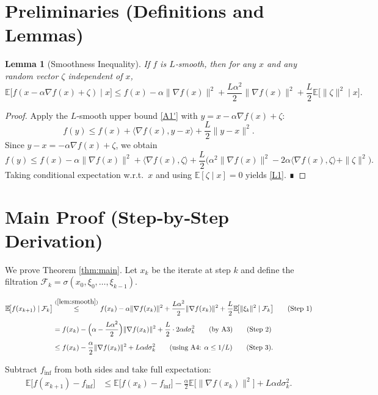 \documentclass{article}
\newtheorem{lemma}{Lemma}
\begin{document}
\newpage
\section*{Preliminaries (Definitions and Lemmas)}
\begin{lemma}[Smoothness Inequality]\label{lem:smooth}
If $f$ is $L$‑smooth, then for any $x$ and any random vector $\zeta$ independent of $x$,
\[
\mathbb{E}\!\bigl[f(x-\alpha\nabla f(x)+\zeta)\mid x\bigr]
\le f(x)-\alpha\|\nabla f(x)\|^{2}
+\frac{L\alpha^{2}}{2}\|\nabla f(x)\|^{2}
+\frac{L}{2}\mathbb{E}\!\bigl[\|\zeta\|^{2}\mid x\bigr].
\tag{L1}
\]
\end{lemma}
\begin{proof}
Apply the $L$‑smooth upper bound \eqref{A1'} with $y=x-\alpha\nabla f(x)+\zeta$:
\[
f(y)\le f(x)+\langle\nabla f(x),y-x\rangle+\frac{L}{2}\|y-x\|^{2}.
\]
Since $y-x=-\alpha\nabla f(x)+\zeta$, we obtain
\[
f(y)\le f(x)-\alpha\|\nabla f(x)\|^{2}
+\langle\nabla f(x),\zeta\rangle
+\frac{L}{2}\bigl(\alpha^{2}\|\nabla f(x)\|^{2}
-2\alpha\langle\nabla f(x),\zeta\rangle+\|\zeta\|^{2}\bigr).
\]
Taking conditional expectation w.r.t.\ $x$ and using $\mathbb{E}[\zeta\mid x]=0$ yields \eqref{L1}. ∎
\end{proof}

\section*{Main Proof (Step‑by‑Step Derivation)}
We prove Theorem \ref{thm:main}. Let $x_{k}$ be the iterate at step $k$ and define the filtration $\mathcal{F}_{k}=\sigma(x_{0},\xi_{0},\dots,\xi_{k-1})$.

\begin{align}
\mathbb{E}\!\bigl[f(x_{k+1})\mid\mathcal{F}_{k}\bigr]
&\overset{(\ref{lem:smooth})}{\le}
f(x_{k})-\alpha\|\nabla f(x_{k})\|^{2}
+\frac{L\alpha^{2}}{2}\|\nabla f(x_{k})\|^{2}
+\frac{L}{2}\mathbb{E}\!\bigl[\|\xi_{k}\|^{2}\mid\mathcal{F}_{k}\bigr] \tag{Step 1}\\[4pt]
&=f(x_{k})-\Bigl(\alpha-\frac{L\alpha^{2}}{2}\Bigr)\|\nabla f(x_{k})\|^{2}
+\frac{L}{2}\cdot 2\alpha d\sigma_{k}^{2} \qquad\text{(by A3)} \tag{Step 2}\\[4pt]
&\le f(x_{k})-\frac{\alpha}{2}\|\nabla f(x_{k})\|^{2}
+L\alpha d\sigma_{k}^{2} \qquad\text{(using A4: }\alpha\le 1/L\text{)} \tag{Step 3}.
\end{align}

Subtract $f_{\inf}$ from both sides and take full expectation:
\begin{align}
\mathbb{E}\!\bigl[f(x_{k+1})-f_{\inf}\bigr]
&\le \mathbb{E}\!\bigl[f(x_{k})-f_{\inf}\bigr]
-\frac{\alpha}{2}\mathbb{E}\!\bigl[\|\nabla f(x_{k})\|^{2}\bigr]
+L\alpha d\sigma_{k}^{2}. \tag{Step 4}
\end{align}
\end{document}
